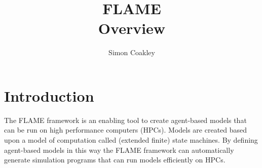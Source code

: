 \documentclass[12pt,a4paper]{article}
\begin{document}
\title{FLAME
\\Overview}
\author{Simon Coakley}

\maketitle





\section{Introduction}

The FLAME framework is an enabling tool to create agent-based models that can
be run on high performance computers (HPCs). Models are created based upon a
model of computation called (extended finite) state machines. By defining
agent-based models in this way the FLAME framework can
automatically generate simulation programs that can run models efficiently on
HPCs.







%
%
\end{document}
